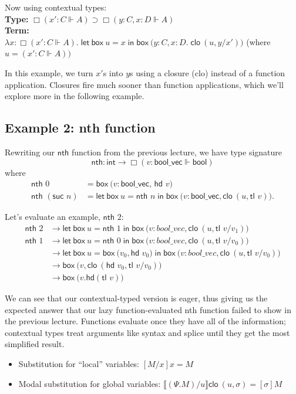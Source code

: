 \documentclass[11pt]{article}
\newcommand{\letin}[2]{\ensuremath{\textsf{let}~#1 \mathrel{\textsf{in}} #2}}
\newcommand{\BOX}[1]{\ensuremath{\textsf{box}~#1}}
\newcommand{\clo}[1]{\ensuremath{\textsf{clo}~#1}}
\begin{document}
Now using contextual types: 
\smallskip \\ 
\textbf{Type: } $\Box(x': C \Vdash A) \supset \Box(y:C, x:D \Vdash A)$
\smallskip
\\ \textbf{Term: } 
\\ $\lambda x: \Box(x': C \Vdash A). \; \letin{\BOX u = x}{\BOX(y:C, x:D. \; \clo{(u, y/x'))}}$ \; (where $u = (x': C \Vdash A))$

In this example, we turn $x'$s into $y$s using a closure (\textsf{clo}) instead of a function application. Closures fire much sooner than function applications, which we'll explore more in the following example.

\subsection{Example 2: \textsf{nth} function}
Rewriting our $\textsf{nth}$ function from the previous lecture, we have type signature 
$$\textsf{nth}: \textsf{int} \longrightarrow \Box(v: \textsf{bool\_vec} \Vdash \textsf{bool})$$ where
\begin{align*}
    \textsf{nth } 0 & = \BOX(v: \textsf{bool\_vec},\,\textsf{hd } v) \\
    \textsf{nth } (\textsf{suc } n) & = \letin{\BOX u = \textsf{nth }n}{\BOX(v: \textsf{bool\_vec}, \clo{(u, \textsf{tl }v))}}.
\end{align*}

Let's evaluate an example, $\textsf{nth } 2$:
\begin{align*}
    \textsf{nth }2 & \longrightarrow  \letin{\BOX u = \textsf{nth }1}{\BOX(v:{bool\_vec}, \clo{(u, \textsf{tl }v/v_1))}}\\
    \textsf{nth } 1 & \longrightarrow \letin{\BOX u = \textsf{nth }0}{\BOX(v:{bool\_vec}, \clo{(u, \textsf{tl }v/v_0))}}\\
    &\longrightarrow \letin{\BOX u = \BOX(v_0, \textsf{hd }v_0)}{\BOX(v:{bool\_vec}, \clo{(u, \textsf{tl }v/v_0))}}\\
    &\longrightarrow \BOX(v, \clo{(\textsf{hd }v_0, \textsf{tl }v/v_0))} \\
    &\longrightarrow \BOX(v. \textsf{hd}(\textsf{tl }v))
\end{align*}

We can see that our contextual-typed version is eager, thus giving us the expected answer that our lazy function-evaluated \textsf{nth } function failed to show in the previous lecture. Functions evaluate once they have all of the information; contextual types treat arguments like syntax and splice until they get the most simplified result.
\begin{itemize}
    \item Substitution for ``local'' variables: $[M/x]x = M$
    \item Modal substitution for global variables: $\llbracket (\Psi. M)/u\rrbracket \clo{(u, \sigma)} = [\sigma] M$
\end{itemize}
\end{document}
